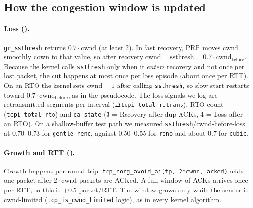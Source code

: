 \documentclass[11pt]{article}
\newcommand{\alg}[1]{\texttt{#1}}
\begin{document}
\subsection{How the congestion window is updated}

\paragraph{Loss (\grSsthresh).}
\texttt{gr\_ssthresh} returns $0.7\cdot\text{cwnd}$ (at least 2). In fast recovery, PRR moves
cwnd smoothly down to that value, so after recovery $\text{cwnd} = \text{ssthresh} = 0.7\cdot\text{cwnd}_{\text{before}}$.
Because the kernel calls \texttt{ssthresh} only when it \emph{enters} recovery and not once per lost
packet, the cut happens at most once per loss episode (about once per RTT). On an RTO the kernel sets
$\text{cwnd}=1$ after calling \texttt{ssthresh}, so slow start restarts toward $0.7\cdot\text{cwnd}_{\text{before}}$,
as in the pseudocode. The loss signals we log are retransmitted segments per interval
($\Delta$\texttt{tcpi\_total\_retrans}), RTO count (\texttt{tcpi\_total\_rto}) and \texttt{ca\_state}
(3 = Recovery after dup ACKs, 4 = Loss after an RTO).
On a shallow-buffer test path we measured \texttt{ssthresh}/cwnd-before-loss at 0.70--0.73 for
\alg{gentle\_reno}, against 0.50--0.55 for \alg{reno} and about 0.7 for \alg{cubic}.

\paragraph{Growth and RTT (\grCongAvoid).}
Growth happens per round trip. \texttt{tcp\_cong\_avoid\_ai(tp, 2*cwnd, acked)} adds one packet after
$2\cdot\text{cwnd}$ packets are ACKed. A full window of ACKs arrives once per RTT, so this is $+0.5$
packet/RTT. The window grows only while the sender is cwnd-limited (\texttt{tcp\_is\_cwnd\_limited} logic), as in
every kernel algorithm.
\end{document}
